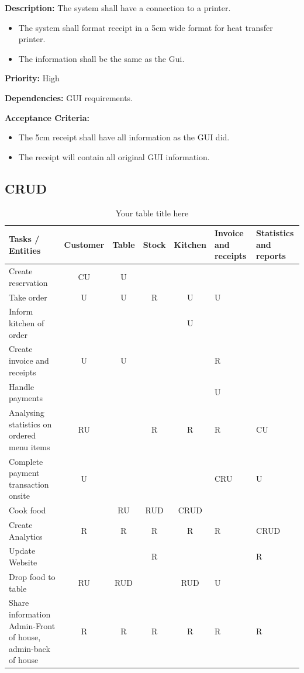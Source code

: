 \documentclass{article}
\begin{document}
\textbf{Description:} The system shall have a connection to a printer.
\begin{itemize}
    \item The system shall format receipt in a 5cm wide format for heat transfer printer.
    \item The information shall be the same as the Gui.
\end{itemize}


\textbf{Priority:} High


\textbf{Dependencies:} GUI requirements.


\textbf{Acceptance Criteria:} \begin{itemize}
    \item The 5cm receipt shall have all information as the GUI did.
    \item The receipt will contain all original GUI information.
\end{itemize}






\clearpage
\subsection{CRUD}

\begin{table}[h!]
  \centering
  \begin{tabular}{|p{4cm}|c|c|c|c|p{2cm}|p{2.5cm}|}
    \hline
    \textbf{Tasks / Entities} & \textbf{Customer} & \textbf{Table} & \textbf{Stock} & \textbf{Kitchen} & \textbf{Invoice and receipts} & \textbf{Statistics and reports} \\
    \hline
    Create reservation & CU & U & & & & \\
    \hline
    Take order & U & U & R & U & U & \\
    \hline
    Inform kitchen of order & & & & U & & \\
    \hline
    Create invoice and receipts & U & U & & & R & \\
    \hline
    Handle payments & & & & & U & \\
    \hline
    Analysing statistics on ordered menu items & RU & & R & R & R & CU \\
    \hline
    Complete payment transaction onsite & U & & & & CRU & U \\
    \hline
    Cook food & & RU & RUD & CRUD & & \\
    \hline
    Create Analytics & R & R & R & R & R & CRUD \\
    \hline
    Update Website & & & R & & & R \\
    \hline
    Drop food to table & RU & RUD & & RUD & U & \\
    \hline
    Share information Admin-Front of house, admin-back of house & R & R & R & R & R & R \\
    \hline
  \end{tabular}
  \caption{Your table title here}
\end{table}
\end{document}
